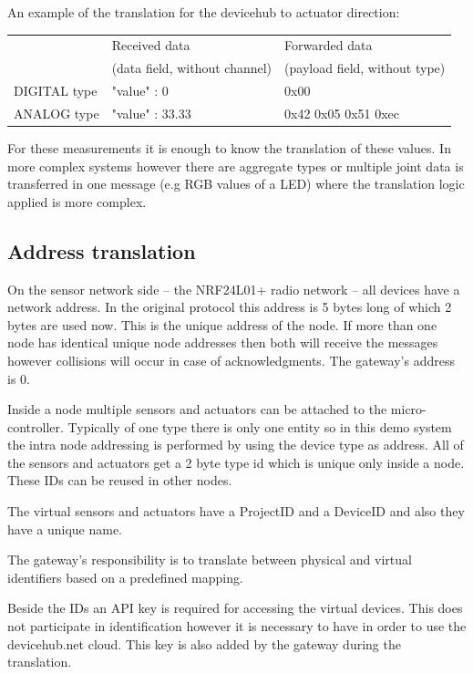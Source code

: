 \documentclass[a4paper]{article}
\begin{document}
An example of the translation for the devicehub to actuator direction:

\begin{tabular}{|l|l|l|}
    \hline
                 & Received data                 & Forwarded data                 \\
                 & (data field, without channel) & (payload field, without type)  \\
    \hline
    DIGITAL type & {"value" : 0}                 & 0x00                           \\
    \hline
    ANALOG type  & {"value" : 33.33}             & 0x42 0x05 0x51 0xec            \\
    \hline
\end{tabular}

For these measurements it is enough to know the translation of these values. In more complex
systems however there are aggregate types or multiple joint data is transferred in one message
(e.g RGB values of a LED) where the translation logic applied is more complex.

\subsection{Address translation}

On the sensor network side -- the NRF24L01+ radio network -- all devices have a network address.
In the original protocol this address is 5 bytes long of which 2 bytes are used now. This is
the unique address of the node. If more than one node has identical unique node addresses
then both will receive the messages however collisions will occur in case of acknowledgments.
The gateway's address is 0.

Inside a node multiple sensors and actuators can be attached to the micro-controller. Typically
of one type there is only one entity so in this demo system the intra node addressing is performed by using
the device type as address. All of the sensors and actuators get a 2 byte type id which is unique only
inside a node. These IDs can be reused in other nodes.

The virtual sensors and actuators have a ProjectID and a DeviceID and also they have a
unique name.

The gateway's responsibility is to translate between physical and virtual identifiers
based on a predefined mapping.

Beside the IDs an API key is required for accessing the virtual devices. This does not
participate in identification however it is necessary to have in order to use the devicehub.net
cloud. This key is also added by the gateway during the translation.
\end{document}
